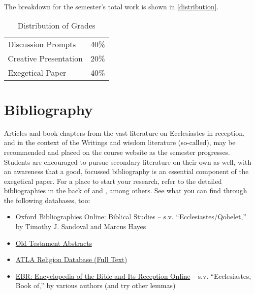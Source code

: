 \documentclass[titlepage]{article}
\newcommand\policy{../policy}
\begin{document}
The breakdown for the semester's total work is shown in
\autoref{distribution}.

\begin{table}[htbp]
  \centering
  {\lining
  \begin{tabular}{lr}
    \toprule
    Discussion Prompts    & 40\% \\
    Creative Presentation & 20\% \\
    Exegetical Paper      & 40\% \\
    \bottomrule
  \end{tabular}}
  \caption{Distribution of Grades}
  \label{distribution}
\end{table}





\section{Bibliography}
\label{bib}

Articles and book chapters from the vast literature on Ecclesiastes in
reception, and in the context of the Writings and wisdom literature
(so-called), may be recommended and placed on the course website as the
semester progresses. Students are encouraged to pursue secondary
literature on their own as well, with an awareness that a good, focussed
bibliography is an essential component of the exegetical paper. For a
place to start your research, refer to the detailed bibliographies in
the back of \cite{Christianson} and \cite{Dell13}, among others. See
what you can find through the following databases, too:

\begin{itemize}
\item \href{https://www.oxfordbibliographies.com/display/document/obo-9780195393361/obo-9780195393361-0015.xml#obo-9780195393361-0015-div1-0005}{Oxford Bibliographies Online: Biblical Studies} -- s.v. “Ecclesiastes/Qohelet,” by Timothy J. Sandoval and Marcus Hayes
\item \href{https://search.ebscohost.com/login.aspx?authtype=ip,shib&custid=s5315951&groupid=main&profile=ehost&defaultdb=ota}{Old Testament Abstracts}
\item \href{https://search.ebscohost.com/login.aspx?authtype=ip,shib&custid=s5315951&groupid=main&profile=ehost&defaultdb=rfh}{ATLA Religion Database (Full Text)}
\item \href{https://go.openathens.net/redirector/astheology.ns.ca?url=https://www.degruyter.com/document/doi/10.1515/ebr/html}{EBR: Encyclopedia of the Bible and Its Reception Online} --
s.v. “Ecclesiastes, Book of,” by various authors (and try other lemmas)
\end{itemize}
\end{document}
